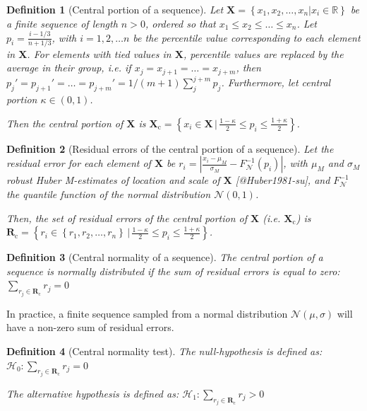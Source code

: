 \documentclass[
  a4paper,
]{article}
\newtheorem*{definition}{Definition}
\begin{document}
\begin{definition}[Central portion of a sequence]
Let $\mathbf{X} = \left\{x_1, x_2, \ldots, x_n | x_i \in \mathbb{R}\right\}$ be a finite sequence of length $n > 0$,
ordered so that $x_1 \leq x_2 \leq \ldots \leq x_n$.
Let $p_i = \frac{i - 1/3}{n + 1/3}$, with $i = 1, 2, \ldots n$ be the percentile value
corresponding to each element in $\mathbf{X}$. For elements with tied values in $\mathbf{X}$,
percentile values are replaced by the average in their group, i.e.
if $x_j = x_{j+1} = \ldots = x_{j+m}$, then 
$p_j' = p_{j+1}' = \ldots = p_{j+m}' = 1/(m+1)\sum_j^{j+m}p_j$.
Furthermore, let central portion $\kappa \in (0,1)$.

Then the central portion of $\mathbf{X}$ is 
$\mathbf{X}_{\text{c}} = \left\{x_i \in \mathbf{X} \, | \,  \frac{1-\kappa}{2} \leq  p_i \leq \frac{1 + \kappa}{2}\right\}$.

\end{definition}

\begin{definition}[Residual errors of the central portion of a sequence]

Let the residual error for each element of $\mathbf{X}$ be $r_i =\left| \frac{x_i - \mu_M}{\sigma_M} - F^{-1}_{\mathcal{N}}(p_i) \right|$, 
with $\mu_M$ and $\sigma_M$ robust Huber M-estimates of location and scale of $\mathbf{X}$ [@Huber1981-su], 
and $F^{-1}_{\mathcal{N}}$ the quantile function of the normal distribution $\mathcal{N}(0, 1)$.

Then, the set of residual errors of the central portion of $\mathbf{X}$ (i.e. $\mathbf{X}_{\text{c}}$) is
$\mathbf{R}_{\text{c}} = \left\{ r_i \in \left\{ r_1, r_2, \ldots, r_n\right\} \, | \,  \frac{1-\kappa}{2} \leq  p_i \leq \frac{1 + \kappa}{2}\right\}$.

\end{definition}

\begin{definition}[Central normality of a sequence]

The central portion of a sequence is normally distributed if the sum of residual
errors is equal to zero:
$\sum_{r_j \in \mathbf{R}_{\text{c}}} r_j = 0$

\end{definition}

In practice, a finite sequence sampled from a normal distribution
\(\mathcal{N}(\mu, \sigma)\) will have a non-zero sum of residual
errors.

\begin{definition}[Central normality test]
The null-hypothesis is defined as: $\mathcal{H}_0: \sum_{r_j \in \mathbf{R}_{\text{c}}}r_j = 0$

The alternative hypothesis is defined as: $\mathcal{H}_1: \sum_{r_j \in \mathbf{R}_{\text{c}}}r_j > 0$
\end{definition}
\end{document}
